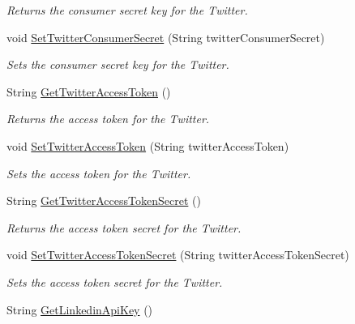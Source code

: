 \begin{DoxyCompactItemize}
\begin{DoxyCompactList}\small\item\em Returns the consumer secret key for the Twitter. \end{DoxyCompactList}\item 
void \hyperlink{classcom_1_1shephertz_1_1app42_1_1paas_1_1sdk_1_1windows_1_1social_1_1_social_a875292968a2eaf3e7b0b914eb37d2b9f}{Set\+Twitter\+Consumer\+Secret} (String twitter\+Consumer\+Secret)
\begin{DoxyCompactList}\small\item\em Sets the consumer secret key for the Twitter. \end{DoxyCompactList}\item 
String \hyperlink{classcom_1_1shephertz_1_1app42_1_1paas_1_1sdk_1_1windows_1_1social_1_1_social_a49a8f41eaffb8283c38434b1a2324348}{Get\+Twitter\+Access\+Token} ()
\begin{DoxyCompactList}\small\item\em Returns the access token for the Twitter. \end{DoxyCompactList}\item 
void \hyperlink{classcom_1_1shephertz_1_1app42_1_1paas_1_1sdk_1_1windows_1_1social_1_1_social_a303ff217055fe37f03d67bea11582e4b}{Set\+Twitter\+Access\+Token} (String twitter\+Access\+Token)
\begin{DoxyCompactList}\small\item\em Sets the access token for the Twitter. \end{DoxyCompactList}\item 
String \hyperlink{classcom_1_1shephertz_1_1app42_1_1paas_1_1sdk_1_1windows_1_1social_1_1_social_a2d830cddc2d6f45d0e6c72eba745afb9}{Get\+Twitter\+Access\+Token\+Secret} ()
\begin{DoxyCompactList}\small\item\em Returns the access token secret for the Twitter. \end{DoxyCompactList}\item 
void \hyperlink{classcom_1_1shephertz_1_1app42_1_1paas_1_1sdk_1_1windows_1_1social_1_1_social_a252506648ac6b4fa10429067ce4170db}{Set\+Twitter\+Access\+Token\+Secret} (String twitter\+Access\+Token\+Secret)
\begin{DoxyCompactList}\small\item\em Sets the access token secret for the Twitter. \end{DoxyCompactList}\item 
String \hyperlink{classcom_1_1shephertz_1_1app42_1_1paas_1_1sdk_1_1windows_1_1social_1_1_social_ae33cc54f820f2f5fa64e34460ca51f94}{Get\+Linkedin\+Api\+Key} ()

\end{DoxyCompactItemize}
